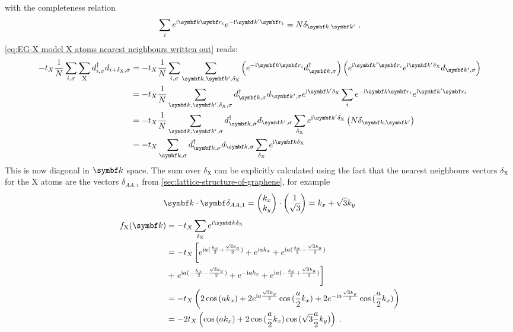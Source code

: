 \documentclass[../main.tex]{subfiles}
\begin{document}
with the completeness relation
\begin{equation}
	\sum_{i} e^{\iu \vb{k} \vb{r}_{i}} e^{-\iu \vb{k}^{\prime} \vb{r}_{i}} = N \delta_{\vb{k}, \vb{k}^{\prime}}\;,
\end{equation}
\cref{eq:EG-X model X atoms nearest neighbours written out} reads:
\begin{align}
	-t_X \frac{1}{N} \sum_{i, \sigma} \sum_{\mathrm{X}} d_{i, \sigma}^{\dagger} d_{i + \delta_{\mathrm{X}}, \sigma}
	&= -t_X \frac{1}{N} \sum_{i,\sigma} \sum_{\vb{k}, \vb{k}^{\prime}, \delta_{\mathrm{X}}} \left(e^{-\iu \vb{k} \vb{r}_i} d_{\vb{k}, \sigma}^{\dagger} \right) \left(e^{\iu \vb{k}^{\prime} \vb{r}_i} e^{\iu \vb{k}^{\prime} \delta_{\mathrm{X}}} d_{\vb{k}^{\prime}, \sigma} \right) \\
	&= -t_X \frac{1}{N} \sum_{\vb{k}, \vb{k^{\prime}}, \delta_{\mathrm{X}}, \sigma} d_{\vb{k}, \sigma}^{\dagger}   d_{\vb{k}^{\prime}, \sigma} e^{\iu \vb{k}^{\prime} \delta_{\mathrm{X}}} \sum_{i} e^{-\iu \vb{k} \vb{r}_i} e^{\iu \vb{k}^{\prime} \vb{r}_i} \\
	&= -t_X \frac{1}{N} \sum_{\vb{k}, \vb{k^{\prime}}, \sigma}  d_{\vb{k}, \sigma}^{\dagger}  d_{\vb{k}^{\prime}, \sigma} \sum_{\delta_{\mathrm{X}}} e^{\iu \vb{k}^{\prime} \delta_{\mathrm{X}}} \left(N \delta_{\vb{k}, \vb{k}^{\prime}} \right)\\
	&= -t_X \sum_{\vb{k}, \sigma}  d_{\vb{k}, \sigma}^{\dagger}d_{\vb{k}, \sigma} \sum_{\delta_{\mathrm{X}}} e^{\iu \vb{k} \delta_{\mathrm{X}}}
\end{align}
This is now diagonal in \(\vb{k}\) space.
The sum over \(\delta_{\mathrm{X}}\) can be explicitly calculated using the fact that the nearest neighbours vectors \(\delta_{\mathrm{X}}\) for the \(\mathrm{X}\) atoms are the vectors \(\delta_{AA, i}\) from \cref{sec:lattice-structure-of-graphene}, for example
\begin{align}
	\vb{k} \cdot \vb{\delta_{AA, 1}} = \begin{pmatrix} k_x \\ k_y \end{pmatrix} \cdot \begin{pmatrix} 1 \\ \sqrt{3} \end{pmatrix} = k_x + \sqrt{3} k_y
\end{align}
\begin{align}
	f_{\mathrm{X}} (\vb{k}) &= -t_X \sum_{\delta_{\mathrm{X}}} e^{\iu \vb{k} \delta_{\mathrm{X}}} \\
	&= -t_X \left[ e^{\iu a (\frac{k_x}{2} + \frac{\sqrt{3} k_y}{2})}
	+ e^{\iu a k_x}
	+ e^{\iu a (\frac{k_x}{2} - \frac{\sqrt{3} k_y}{2})}
	\right. \\
	&+ \left. e^{\iu a (-\frac{k_x}{2} - \frac{\sqrt{3} k_y}{2})}
	+ e^{-\iu a k_x}
	+ e^{\iu a (-\frac{k_x}{2} + \frac{\sqrt{3} k_y}{2})} \right] \\
	&= -t_X \left( 2 \cos{(a k_x)} + 2 e^{\iu a \frac{\sqrt{3} k_y}{2}} \cos{(\frac{a}{2} k_x)} + 2 e^{-\iu a \frac{\sqrt{3} k_y}{2}} \cos{(\frac{a}{2} k_x)} \right) \\
	&= -2t_X \left( \cos{(a k_x)} + 2 \cos{(\frac{a}{2} k_x)} \cos{(\sqrt{3} \frac{ a}{2} k_y)} \right) \;.
\end{align}
\end{document}
